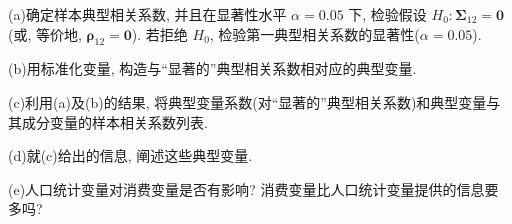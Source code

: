 \noindent (a)\quad 确定样本典型相关系数, 并且在显著性水平 $\alpha=0.05$ 下, 检验假设 $H_0:\boldsymbol{\Sigma}_{12}=\mathbf{0}$(或, 等价地, $\boldsymbol{\rho}_{12}=\mathbf{0}$). 若拒绝 $H_0$, 检验第一典型相关系数的显著性($\alpha=0.05$).

\noindent (b)\quad 用标准化变量, 构造与“显著的”典型相关系数相对应的典型变量.

\noindent (c)\quad 利用(a)及(b)的结果, 将典型变量系数(对“显著的”典型相关系数)和典型变量与其成分变量的样本相关系数列表.

\noindent (d)\quad 就(c)给出的信息, 阐述这些典型变量.

\noindent (e)\quad 人口统计变量对消费变量是否有影响? 消费变量比人口统计变量提供的信息要多吗?
